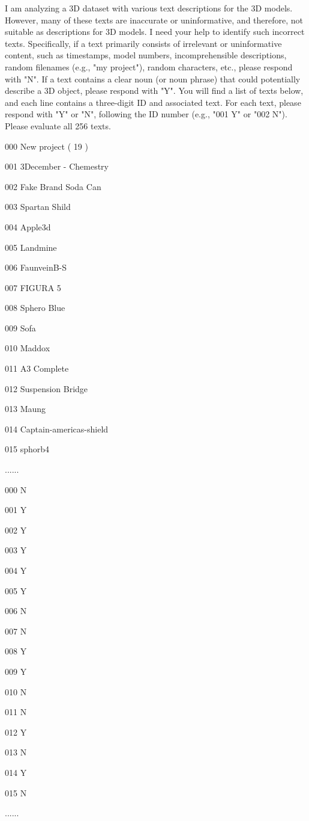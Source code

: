 \begin{minipage}[t]{11.5cm}
\begin{boxM}
I am analyzing a 3D dataset with various text descriptions for the 3D models. However, many of these texts are inaccurate or uninformative, and therefore, not suitable as descriptions for 3D models. I need your help to identify such incorrect texts. Specifically, if a text primarily consists of irrelevant or uninformative content, such as timestamps, model numbers, incomprehensible descriptions, random filenames (e.g., "my project"), random characters, etc., please respond with "N". If a text contains a clear noun (or noun phrase) that could potentially describe a 3D object, please respond with "Y". You will find a list of texts below, and each line contains a three-digit ID and associated text. For each text, please respond with "Y" or "N", following the ID number (e.g., "001 Y" or "002 N"). Please evaluate all 256 texts.

000 New project ( 19 )

001 3December - Chemestry

002 Fake Brand Soda Can

003 Spartan Shild

004 Apple3d

005 Landmine

006 FaunveinB-S

007 FIGURA 5

008 Sphero Blue

009 Sofa

010 Maddox

011 A3 Complete

012 Suspension Bridge

013 Maung

014 Captain-americas-shield

015 sphorb4

......
\end{boxM}
\end{minipage}
\hfill
\begin{minipage}[t]{2cm}
\begin{boxM}
000 N

001 Y

002 Y

003 Y

004 Y

005 Y

006 N

007 N

008 Y

009 Y

010 N

011 N

012 Y

013 N

014 Y

015 N

......

\end{boxM}
\end{minipage}

